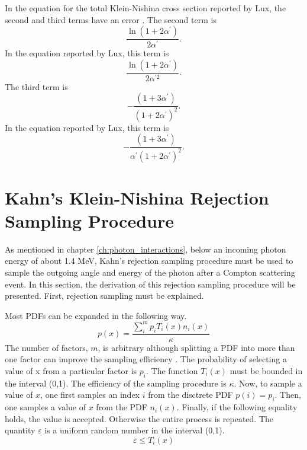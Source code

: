 In the equation for the total Klein-Nishina cross section reported by Lux, the
second and third terms have an error \citep{lux_monte_1991}. The second term is
\begin{equation*}
  \frac{\ln{(1 + 2\alpha^{'})}}{2\alpha^{'}}.
\end{equation*}
In the equation reported by Lux, this term is
\begin{equation*}
  \frac{\ln{(1 + 2\alpha^{'})}}{2\alpha^{'2}}.
\end{equation*}
The third term is 
\begin{equation*}
  -\frac{(1+3\alpha^{'})}{(1+2\alpha^{'})^2}.
\end{equation*}
In the equation reported by Lux, this term is
\begin{equation*}
  -\frac{(1+3\alpha^{'})}{\alpha^{'}(1+2\alpha^{'})^2}.
\end{equation*}

\section{Kahn's Klein-Nishina Rejection Sampling Procedure}
\label{sec:Kahn_rejection_procedure_der}
As mentioned in chapter \ref{ch:photon_interactions}, below an incoming photon
energy of about 1.4 MeV, Kahn's rejection sampling procedure must be used to
sample the outgoing angle and energy of the photon after a Compton scattering
event. In this section, the derivation of this rejection sampling procedure will
be presented. First, rejection sampling must be explained. 

Most PDFs can be expanded in the following way.
\begin{equation}
  p(x) = \frac{\sum_i^m p_i T_i(x)n_i(x)}{\kappa}
  \label{eq:general_pdf_expansion}
\end{equation}
The number of factors, $m$, is arbitrary although splitting a PDF into more than
one factor can improve the sampling efficiency \citep{kahn_applications_1956}.
The probability of selecting a value of x from a particular factor is $p_i$.
The function $T_i(x)$ must be bounded in the interval (0,1). The efficiency
of the sampling procedure is $\kappa$. Now, to sample a value of $x$, one 
first samples an index $i$ from the disctrete PDF $p(i) = p_i$. Then, one 
samples a value of $x$ from the PDF $n_i(x)$. Finally, if the following 
equality holds, the value is accepted. Otherwise the entire process is repeated.
The quantity $\varepsilon$ is a uniform random number in the interval (0,1).
\begin{equation*}
  \varepsilon \leq T_i(x)
\end{equation*}

